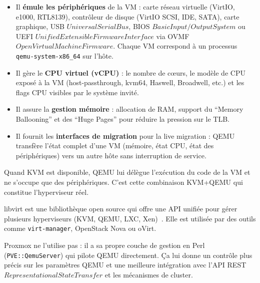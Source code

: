 \begin{itemize}

    \item Il \textbf{émule les périphériques} de la VM : carte réseau virtuelle (VirtIO, e1000, RTL8139), contrôleur de disque (VirtIO SCSI, IDE, SATA), carte graphique, USB \(Universal Serial Bus\), BIOS \(Basic Input/Output System\) ou UEFI \(Unified Extensible Firmware Interface\) via OVMF \(Open Virtual Machine Firmware\). Chaque VM correspond à un processus \texttt{qemu-system-x86\_64} sur l'hôte.

    \item Il gère le \textbf{CPU virtuel (vCPU)} : le nombre de c\oe{}urs, le modèle de CPU exposé à la VM (host-passthrough, kvm64, Haswell, Broadwell, etc.) et les flags CPU visibles par le système invité.

    \item Il assure la \textbf{gestion mémoire} : allocation de RAM, support du ``Memory Ballooning'' et des ``Huge Pages'' pour réduire la pression sur le TLB.

    \item Il fournit les \textbf{interfaces de migration} pour la live migration : QEMU transfère l'état complet d'une VM (mémoire, état CPU, état des périphériques) vers un autre hôte sans interruption de service.

\end{itemize}

\par Quand KVM est disponible, QEMU lui délègue l'exécution du code de la VM et ne s'occupe que des périphériques. C'est cette combinaison KVM+QEMU qui constitue l'hyperviseur réel.\\


\par libvirt est une bibliothèque open source qui offre une API unifiée pour gérer plusieurs hyperviseurs (KVM, QEMU, LXC, Xen)~\cite{refLibvirt}. Elle est utilisée par des outils comme \texttt{virt-manager}, OpenStack Nova ou oVirt.\\

\par Proxmox ne l'utilise pas : il a sa propre couche de gestion en Perl (\texttt{PVE::QemuServer}) qui pilote QEMU directement. Ça lui donne un contrôle plus précis sur les paramètres QEMU et une meilleure intégration avec l'API REST \(Representational State Transfer\) et les mécanismes de cluster.\\

